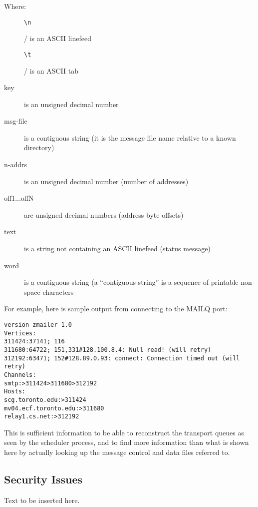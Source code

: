 Where:
\begin{description}
\item[] \mbox{}

\begin{verbatim}
\n
\end{verbatim}
/ is an ASCII linefeed

\item[] \mbox{}

\begin{verbatim}
\t
\end{verbatim}
/ is an ASCII tab

\item[key] \mbox{}

is an unsigned decimal number

\item[msg-file] \mbox{}

is a contiguous string (it is the message file name relative 
to a known directory)

\item[n-addrs] \mbox{}

is an unsigned decimal number (number of addresses)

\item[off1...offN] \mbox{}

are unsigned decimal numbers (address byte offsets)

\item[text] \mbox{}

is a string not containing an ASCII linefeed (status message)

\item[word] \mbox{}

is a contiguous string (a ``contiguous string'' is a sequence of 
printable non-space characters

\end{description}

For example, here is sample output from connecting to  the
MAILQ port:
\begin{verbatim}
version zmailer 1.0
Vertices:
311424:37141; 116
311680:64722; 151,331#128.100.8.4: Null read! (will retry)
312192:63471; 152#128.89.0.93: connect: Connection timed out (will retry)
Channels:
smtp:>311424>311680>312192
Hosts:
scg.toronto.edu:>311424
mv04.ecf.toronto.edu:>311680
relay1.cs.net:>312192
\end{verbatim}


This is sufficient information to be able to reconstruct
the transport queues as seen by the scheduler process, and
to find more information than what is shown here by 
actually  looking  up  the  message     control  and  data  files
referred to.

\subsection{Security Issues}

Text to be inserted here.

